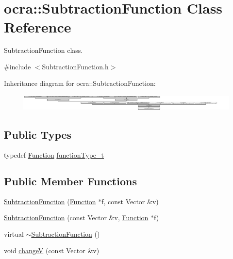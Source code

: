 \hypertarget{classocra_1_1SubtractionFunction}{}\section{ocra\+:\+:Subtraction\+Function Class Reference}
\label{classocra_1_1SubtractionFunction}


Subtraction\+Function class.  




{\ttfamily \#include $<$Subtraction\+Function.\+h$>$}

Inheritance diagram for ocra\+:\+:Subtraction\+Function\+:\begin{figure}[H]
\begin{center}
\leavevmode
\includegraphics[height=0.901771cm]{df/d5a/classocra_1_1SubtractionFunction}
\end{center}
\end{figure}
\subsection*{Public Types}
\begin{DoxyCompactItemize}
\item 
typedef \hyperlink{classocra_1_1Function}{Function} \hyperlink{classocra_1_1SubtractionFunction_a371966d5def8140a019099fc4346f413}{function\+Type\+\_\+t}
\end{DoxyCompactItemize}
\subsection*{Public Member Functions}
\begin{DoxyCompactItemize}
\item 
\hyperlink{classocra_1_1SubtractionFunction_a65b777d9cbd05c1e14063fd0bb99f262}{Subtraction\+Function} (\hyperlink{classocra_1_1Function}{Function} $\ast$f, const Vector \&v)
\item 
\hyperlink{classocra_1_1SubtractionFunction_ab825dea759ffedcdd1c30b19e1df02f1}{Subtraction\+Function} (const Vector \&v, \hyperlink{classocra_1_1Function}{Function} $\ast$f)
\item 
virtual \hyperlink{classocra_1_1SubtractionFunction_a87e030eb99b05722464881e3bb220027}{$\sim$\+Subtraction\+Function} ()
\item 
void \hyperlink{classocra_1_1SubtractionFunction_a00ed4b4afd66bd91dea2f2ebbcd5b615}{changeV} (const Vector \&v)
\end{DoxyCompactItemize}
